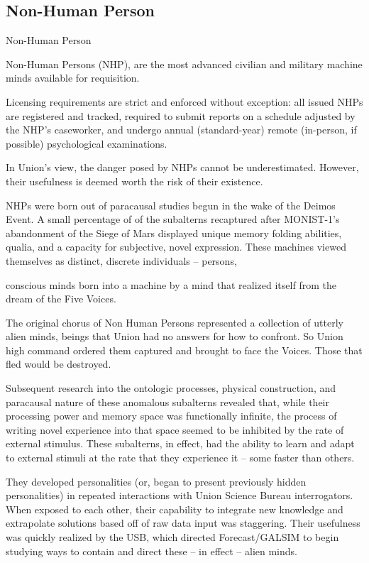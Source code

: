 \subsection{Non-Human Person}
Non-Human Person   

Non-Human Persons (NHP), are the most advanced civilian and military machine minds available  
for requisition. 
 

Licensing requirements are strict and enforced without exception: all issued NHPs are registered  
and tracked, required to submit reports on a schedule adjusted by the NHP’s caseworker, and  
undergo annual (standard-year) remote (in-person, if possible) psychological examinations. 
 

In Union’s view, the danger posed by NHPs cannot be underestimated. However, their usefulness  
is deemed worth the risk of their existence. 
 

NHPs were born out of paracausal studies begun in the wake of the Deimos Event. A small  
percentage of of the subalterns recaptured after MONIST-1’s abandonment of the Siege of Mars  
displayed unique memory folding abilities, qualia, and a capacity for subjective, novel  
expression. These machines viewed themselves as distinct, discrete individuals -- persons,  

                                                                                                             


conscious minds born into a machine by a mind that realized itself from the dream of the Five  
Voices. 
 

The original chorus of Non Human Persons represented a collection of utterly alien minds, beings  
that Union had no answers for how to confront. So Union high command ordered them captured  
and brought to face the Voices. Those that fled would be destroyed.  
 

Subsequent research into the ontologic processes, physical construction, and paracausal nature  
of these anomalous subalterns revealed that, while their processing power and memory space  
was functionally infinite, the process of writing novel experience into that space seemed to be  
inhibited by the rate of external stimulus. These subalterns, in effect, had the ability to learn and  
adapt to external stimuli at the rate that they experience it -- some faster than others. 
 

They developed personalities (or, began to present previously hidden personalities) in repeated  
interactions with Union Science Bureau interrogators. When exposed to each other, their  
capability to integrate new knowledge and extrapolate solutions based off of raw data input was  
staggering. Their usefulness was quickly realized by the USB, which directed Forecast/GALSIM  
to begin studying ways to contain and direct these -- in effect -- alien minds. 
 

